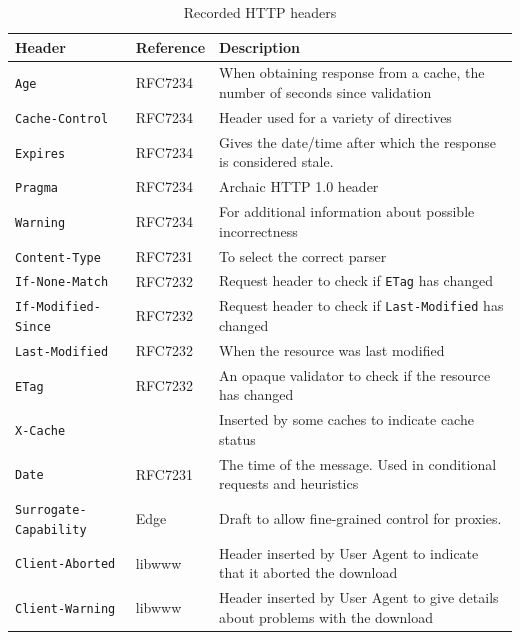 \documentclass{llncs}
\newcommand{\httph}[1]{\texttt{#1}}
\begin{document}
\begin{table}[bt]
\caption{Recorded HTTP headers}\label{tab:headers}
 \begin{tabular}{ | l |  p{1.4cm} | p{6.8cm} |}
    \hline
    Header & Reference & Description \\ \hline
\httph{Age} & RFC7234 & When obtaining response from a cache, the number of
seconds since validation \\ \hline
\httph{Cache-Control} & RFC7234 & Header used for a variety of directives \\ \hline
\httph{Expires} & RFC7234  & Gives the date/time after which the
   response is considered stale. \\ \hline
\httph{Pragma} & RFC7234 & Archaic HTTP 1.0 header  \\ \hline
\httph{Warning} & RFC7234  & For additional information about possible incorrectness \\ \hline
\httph{Content-Type} & RFC7231 & To select the correct parser \\ \hline
\httph{If-None-Match} & RFC7232  & Request header to check if
                                   \httph{ETag} has changed   \\ \hline
\httph{If-Modified-Since} & RFC7232  & Request header to check if
                                   \httph{Last-Modified} has changed    \\ \hline
\httph{Last-Modified} & RFC7232 & When the resource was last modified \\ \hline
\httph{ETag} & RFC7232 & An opaque validator to check if the resource
has changed  \\ \hline
\httph{X-Cache} &  & Inserted by some caches to indicate cache status \\ \hline
\httph{Date} & RFC7231 & The time of the message. Used in conditional requests
and heuristics \\ \hline
\httph{Surrogate-Capability} & Edge \cite{edgearch} & Draft
to allow fine-grained control for proxies. \\ \hline
\httph{Client-Aborted} & libwww  & Header inserted by User
Agent to indicate that it aborted the download \\ \hline
\httph{Client-Warning} & libwww  & Header inserted by User
Agent to give details about problems with the download \\ \hline

    \hline
    \end{tabular}
\end{table}
\end{document}
